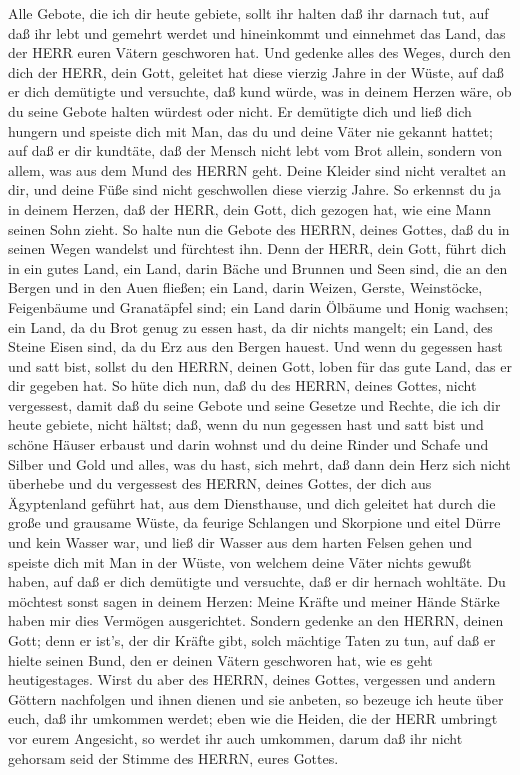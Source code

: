  Alle Gebote, die ich dir heute gebiete, sollt ihr halten
daß ihr darnach tut, auf daß ihr lebt und gemehrt werdet und hineinkommt
und einnehmet das Land, das der HERR euren Vätern geschworen hat.
 Und gedenke alles des Weges, durch den dich der HERR, dein
Gott, geleitet hat diese vierzig Jahre in der Wüste, auf daß er dich
demütigte und versuchte, daß kund würde, was in deinem Herzen wäre, ob
du seine Gebote halten würdest oder nicht.  Er demütigte
dich und ließ dich hungern und speiste dich mit Man, das du und deine
Väter nie gekannt hattet; auf daß er dir kundtäte, daß der Mensch nicht
lebt vom Brot allein, sondern von allem, was aus dem Mund des HERRN
geht.  Deine Kleider sind nicht veraltet an dir, und deine
Füße sind nicht geschwollen diese vierzig Jahre.  So
erkennst du ja in deinem Herzen, daß der HERR, dein Gott, dich gezogen
hat, wie eine Mann seinen Sohn zieht.  So halte nun die
Gebote des HERRN, deines Gottes, daß du in seinen Wegen wandelst und
fürchtest ihn.  Denn der HERR, dein Gott, führt dich in ein
gutes Land, ein Land, darin Bäche und Brunnen und Seen sind, die an den
Bergen und in den Auen fließen;  ein Land, darin Weizen,
Gerste, Weinstöcke, Feigenbäume und Granatäpfel sind; ein Land darin
Ölbäume und Honig wachsen;  ein Land, da du Brot genug zu
essen hast, da dir nichts mangelt; ein Land, des Steine Eisen sind, da
du Erz aus den Bergen hauest.  Und wenn du gegessen hast
und satt bist, sollst du den HERRN, deinen Gott, loben für das gute
Land, das er dir gegeben hat.  So hüte dich nun, daß du des
HERRN, deines Gottes, nicht vergessest, damit daß du seine Gebote und
seine Gesetze und Rechte, die ich dir heute gebiete, nicht hältst;
 daß, wenn du nun gegessen hast und satt bist und schöne
Häuser erbaust und darin wohnst  und du deine Rinder und
Schafe und Silber und Gold und alles, was du hast, sich mehrt,
 daß dann dein Herz sich nicht überhebe und du vergessest
des HERRN, deines Gottes, der dich aus Ägyptenland geführt hat, aus dem
Diensthause,  und dich geleitet hat durch die große und
grausame Wüste, da feurige Schlangen und Skorpione und eitel Dürre und
kein Wasser war, und ließ dir Wasser aus dem harten Felsen gehen
 und speiste dich mit Man in der Wüste, von welchem deine
Väter nichts gewußt haben, auf daß er dich demütigte und versuchte, daß
er dir hernach wohltäte.  Du möchtest sonst sagen in deinem
Herzen: Meine Kräfte und meiner Hände Stärke haben mir dies Vermögen
ausgerichtet.  Sondern gedenke an den HERRN, deinen Gott;
denn er ist's, der dir Kräfte gibt, solch mächtige Taten zu tun, auf daß
er hielte seinen Bund, den er deinen Vätern geschworen hat, wie es geht
heutigestages.  Wirst du aber des HERRN, deines Gottes,
vergessen und andern Göttern nachfolgen und ihnen dienen und sie
anbeten, so bezeuge ich heute über euch, daß ihr umkommen werdet;
 eben wie die Heiden, die der HERR umbringt vor eurem
Angesicht, so werdet ihr auch umkommen, darum daß ihr nicht gehorsam
seid der Stimme des HERRN, eures Gottes.

